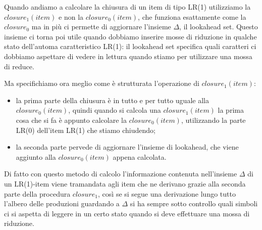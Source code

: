 \documentclass[class=book, crop=false, oneside, 12pt]{standalone}
\begin{document}
Quando andiamo a calcolare la chiusura di un item di tipo LR(1) utilizziamo la \(closure_1(item)\) e non la \(closure_0(item)\), che funziona esattamente come la \(closure_0\) ma in più ci permette di aggiornare l'insieme \(\Delta\), il lookahead set. Questo insieme ci torna poi utile quando dobbiamo inserire mosse di riduzione in qualche stato dell'automa caratteristico LR(1): il lookahead set specifica quali caratteri ci dobbiamo aspettare di vedere in lettura quando stiamo per utilizzare una mossa di reduce.

Ma specifichiamo ora meglio come è strutturata l'operazione di \(closure_1(item)\):
\begin{itemize}
    \item la prima parte della chiusura è in tutto e per tutto uguale alla \(closure_0(item)\), quindi quando si calcola una \(closure_1(item)\) la prima cosa che si fa è appunto calcolare la \(closure_0(item)\), utilizzando la parte LR(0) dell'item LR(1) che stiamo chiudendo;
    \item la seconda parte pervede di aggiornare l'insieme di lookahead, che viene aggiunto alla \(closure_0(item)\) appena calcolata.  
\end{itemize}
Di fatto con questo metodo di calcolo l'informazione contenuta nell'insieme \(\Delta\) di un LR(1)-item viene tramandata agli item che ne derivano grazie alla seconda parte della procedura \(closure_1\), così se si segue una derivazione lungo tutto l'albero delle produzioni guardando a \(\Delta\) si ha sempre sotto controllo quali simboli ci si aspetta di leggere in un certo stato quando si deve effettuare una mossa di riduzione.
\end{document}
